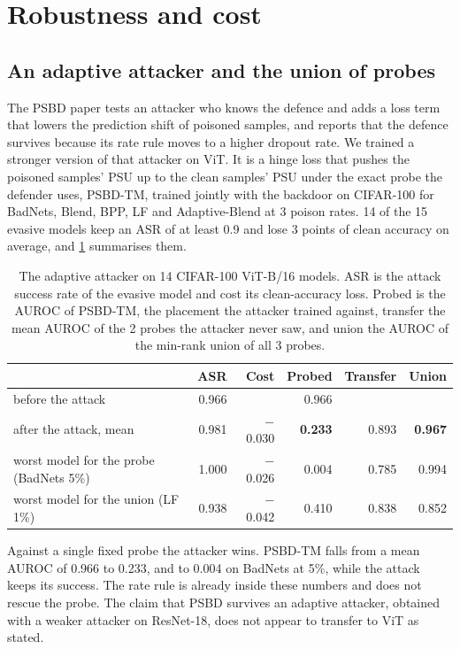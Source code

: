 \section{Robustness and cost}
\label{sec:robustness}

\subsection{An adaptive attacker and the union of probes}
\label{sec:robustness:adaptive}

The PSBD paper tests an attacker who knows the defence and adds a loss term that lowers the prediction shift of poisoned samples, and reports that the defence survives because its rate rule moves to a higher dropout rate. We trained a stronger version of that attacker on ViT. It is a hinge loss that pushes the poisoned samples' PSU up to the clean samples' PSU under the exact probe the defender uses, PSBD-TM, trained jointly with the backdoor on CIFAR-100 for BadNets, Blend, BPP, LF and Adaptive-Blend at 3 poison rates. 14 of the 15 evasive models keep an ASR of at least 0.9 and lose 3 points of clean accuracy on average, and \cref{tab:adaptive} summarises them.

\begin{table}[t]
\centering\small
\caption{The adaptive attacker on 14 CIFAR-100 ViT-B/16 models. ASR is the attack success rate of the evasive model and cost its clean-accuracy loss. Probed is the AUROC of PSBD-TM, the placement the attacker trained against, transfer the mean AUROC of the 2 probes the attacker never saw, and union the AUROC of the min-rank union of all 3 probes.}
\label{tab:adaptive}
\begin{tabular}{lrrrrr}
\toprule
 & ASR & Cost & Probed & Transfer & Union \\
\midrule
before the attack & 0.966 & & 0.966 & & \\
after the attack, mean & 0.981 & $-$0.030 & \textbf{0.233} & 0.893 & \textbf{0.967} \\
worst model for the probe (BadNets 5\%) & 1.000 & $-$0.026 & 0.004 & 0.785 & 0.994 \\
worst model for the union (LF 1\%) & 0.938 & $-$0.042 & 0.410 & 0.838 & 0.852 \\
\bottomrule
\end{tabular}
\end{table}

Against a single fixed probe the attacker wins. PSBD-TM falls from a mean AUROC of 0.966 to 0.233, and to 0.004 on BadNets at 5\%, while the attack keeps its success. The rate rule is already inside these numbers and does not rescue the probe. The claim that PSBD survives an adaptive attacker, obtained with a weaker attacker on ResNet-18, does not appear to transfer to ViT as stated.


